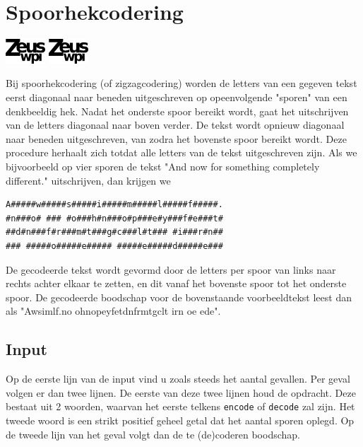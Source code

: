 
\section*{Spoorhekcodering}
\flushright
\includegraphics[width=4em]{logo-new.png}
\includegraphics[width=4em]{logo-new.png}
\flushleft

Bij spoorhekcodering (of zigzagcodering) worden de letters van een gegeven tekst
eerst diagonaal naar beneden uitgeschreven op opeenvolgende "sporen" van een
denkbeeldig hek. Nadat het onderste spoor bereikt wordt, gaat het uitschrijven
van de letters diagonaal naar boven verder. De tekst wordt opnieuw diagonaal
naar beneden uitgeschreven, van zodra het bovenste spoor bereikt wordt. Deze
procedure herhaalt zich totdat alle letters van de tekst uitgeschreven zijn. Als
we bijvoorbeeld op vier sporen de tekst "And now for something completely
different." uitschrijven, dan krijgen we

\begin{verbatim}
A#####w#####s#####i#####m#####l#####f#####.
#n###o# ### #o###h#n###o#p###e#y###f#e###t#
##d#n###f#r###m#t###g#c###l#t### #i###r#n##
### #####o#####e##### #####e#####d#####e###
\end{verbatim}

De gecodeerde tekst wordt gevormd door de letters per spoor van links naar
rechts achter elkaar te zetten, en dit vanaf het bovenste spoor tot het onderste
spoor. De gecodeerde boodschap voor de bovenstaande voorbeeldtekst leest dan als
"Awsimlf.no  ohnopeyfetdnfrmtgclt irn oe ede".

\subsection*{Input}

Op de eerste lijn van de input vind u zoals steeds het aantal gevallen. Per
geval volgen er dan twee lijnen. De eerste van deze twee lijnen houd de
opdracht. Deze bestaat uit 2 woorden, waarvan het eerste telkens \texttt{encode}
of \texttt{decode} zal zijn. Het tweede woord is een strikt positief geheel
getal dat het aantal sporen oplegd. Op de tweede lijn van het geval volgt dan de
te (de)coderen boodschap.

